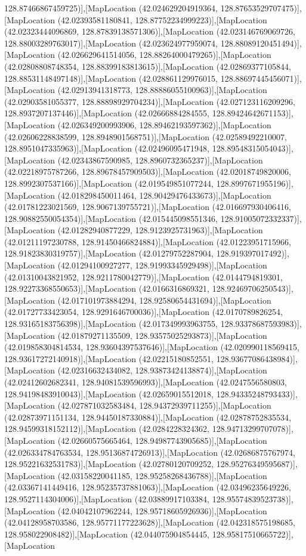 128.87466867459725)],[MapLocation (42.024629204919364, 128.87653529707475)],[MapLocation (42.02393581180841, 128.87752234999223)],[MapLocation (42.02323444096869, 128.87839138571306)],[MapLocation (42.023146769069726, 128.88003289763017)],[MapLocation (42.023624977959074, 128.88089120451494)],[MapLocation (42.026629641514056, 128.88264000479265)],[MapLocation (42.02808808748354, 128.88399183813615)],[MapLocation (42.02869377105844, 128.88531148497148)],[MapLocation (42.028861129976015, 128.88697445456071)],[MapLocation (42.02913941318773, 128.88886055100963)],[MapLocation (42.02903581055377, 128.88898929704234)],[MapLocation (42.027123116209296, 128.8937207137446)],[MapLocation (42.02666884284555, 128.89424642671153)],[MapLocation (42.026349200993906, 128.89462193597362)],[MapLocation (42.02606228838599, 128.8948901568751)],[MapLocation (42.02589492210007, 128.8951047335963)],[MapLocation (42.02496095471948, 128.89548315054043)],[MapLocation (42.02343867590985, 128.8960732365237)],[MapLocation (42.02218975787266, 128.89678457909503)],[MapLocation (42.02018749820006, 128.8992307537166)],[MapLocation (42.019549851077244, 128.8997671955196)],[MapLocation (42.018298450011464, 128.90429476433673)],[MapLocation (42.01781223021569, 128.9067139755721)],[MapLocation (42.016697930406416, 128.90882550054354)],[MapLocation (42.015445098551346, 128.91005072332337)],[MapLocation (42.01282940877229, 128.9123925731963)],[MapLocation (42.01211197230788, 128.91450466824884)],[MapLocation (42.01223951715966, 128.91823830319757)],[MapLocation (42.01279752287904, 128.919397017492)],[MapLocation (42.01294100927277, 128.91993345929498)],[MapLocation (42.01310043821952, 128.9211780042779)],[MapLocation (42.0144794819301, 128.92273368550653)],[MapLocation (42.0166316869321, 128.92469706250543)],[MapLocation (42.017101973884294, 128.92580654431694)],[MapLocation (42.01727733423054, 128.9291646700036)],[MapLocation (42.0170789826254, 128.93165183756398)],[MapLocation (42.017349993963755, 128.93378687593983)],[MapLocation (42.01879271135509, 128.93575025293873)],[MapLocation (42.019858304814534, 128.93604397537646)],[MapLocation (42.020990118569415, 128.93617272140918)],[MapLocation (42.02215180852551, 128.93677086438984)],[MapLocation (42.02316632434082, 128.93873424138874)],[MapLocation (42.02412602682341, 128.94081539596993)],[MapLocation (42.0247556580803, 128.94198483910043)],[MapLocation (42.02659015512018, 128.94335248793433)],[MapLocation (42.027871032583484, 128.94372939711255)],[MapLocation (42.02873971151134, 128.94450187330884)],[MapLocation (42.02878752835534, 128.94599318152112)],[MapLocation (42.0284228324362, 128.94713299707078)],[MapLocation (42.02660575665464, 128.94987743905685)],[MapLocation (42.026334784763534, 128.95136874726913)],[MapLocation (42.02686875767974, 128.95221632531783)],[MapLocation (42.02780120709252, 128.95276349595687)],[MapLocation (42.03158220041185, 128.95258268436788)],[MapLocation (42.03367141449416, 128.95235737881063)],[MapLocation (42.03496235649226, 128.9527114304006)],[MapLocation (42.03889917103384, 128.95574839523738)],[MapLocation (42.04042107962244, 128.95718605926936)],[MapLocation (42.04128958703586, 128.95771177223628)],[MapLocation (42.042318575198685, 128.958022908482)],[MapLocation (42.044075904854445, 128.95817510665722)],[MapLocation 